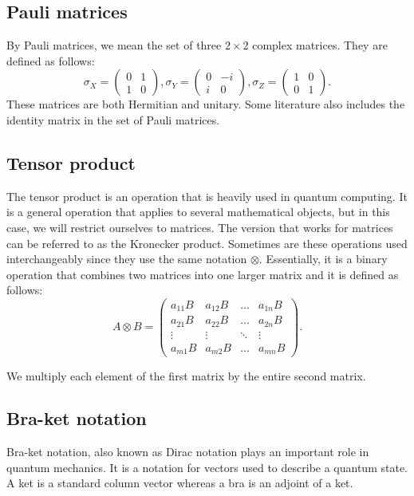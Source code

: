 \subsection{Pauli matrices}\label{sec:pauli-matrices}
By Pauli matrices, we mean the set of three $2 \times 2$ complex matrices. They are defined as follows:
$$\sigma_X = \begin{pmatrix}
    0 & 1 \\
    1 & 0
\end{pmatrix}, \sigma_Y = \begin{pmatrix}
    0 & -i \\
    i & 0
\end{pmatrix}, \sigma_Z = \begin{pmatrix}
    1 & 0 \\
    0 & 1
\end{pmatrix}\text{.}$$ 
These matrices are both Hermitian and unitary. Some literature also includes the identity matrix in the set of Pauli matrices. 

\subsection{Tensor product}
The tensor product is an operation that is heavily used in quantum computing. It is a general operation that applies to several mathematical objects, but in this case, we will restrict ourselves to matrices. The version that works for matrices can be referred to as the Kronecker product. Sometimes are these operations used interchangeably since they use the same notation $\otimes$. Essentially, it is a binary operation that combines two matrices into one larger matrix and it is defined as follows:
$$A \otimes B = \begin{pmatrix}
    a_{11}B & a_{12}B & \hdots & a_{1n}B \\
    a_{21}B & a_{22}B & \hdots & a_{2n}B \\
    \vdots & \vdots & \ddots & \vdots \\
    a_{m1}B & a_{m2}B & \hdots & a_{mn}B
\end{pmatrix}.$$

We multiply each element of the first matrix by the entire second matrix.

\subsection{Bra-ket notation}
Bra-ket notation, also known as Dirac notation plays an important role in quantum mechanics. It is a notation for vectors used to describe a quantum state. A ket is a standard column vector whereas a bra is an adjoint of a ket. 

